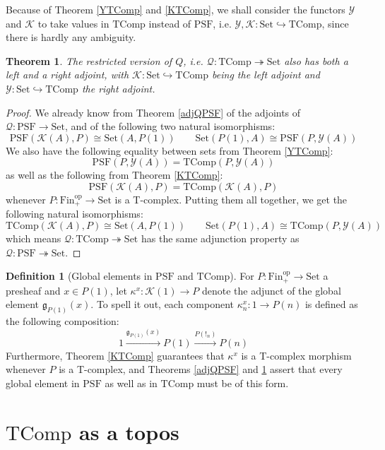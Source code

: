 \documentclass{article}
\newtheorem{theorem}{Theorem}[subsection]
\theoremstyle{remark}
\theoremstyle{definition}
\newtheorem{definition}{Definition}[subsection]
\newcommand{\Fin}{\mathrm{Fin}}
\newcommand{\Set}{\mathrm{Set}}
\newcommand{\PSF}{\mathrm{PSF}}
\newcommand{\op}{\mathrm{op}}
\newcommand{\Y}{\mathcal Y}
\newcommand{\K}{\mathcal K}
\newcommand{\g}{\mathfrak g}
\newcommand{\TComp}{\mathrm{TComp}}
\newcommand{\Q}{\mathcal Q}
\begin{document}
	Because of Theorem \ref{YTComp} and \ref{KTComp}, we shall consider the functors $\Y$ and $\K$ to take values in $\TComp$ instead of $\PSF$, i.e. $\Y,\K:\Set\hookrightarrow\TComp$, since there is hardly any ambiguity.
	\begin{theorem}\label{adjQT}
		The restricted version of $Q$, i.e. $\Q:\TComp\twoheadrightarrow\Set$ also has both a left and a right adjoint, with $\K:\Set\hookrightarrow\TComp$ being the left adjoint and $\Y:\Set\hookrightarrow\TComp$ the right adjoint.
	\end{theorem}
	\begin{proof}
		We already know from Theorem \ref{adjQPSF} of the adjoints of $\Q:\PSF\to\Set$, and of the following two natural isomorphisms:
		\[\PSF(\K(A),P)\cong\Set(A,P(1))\qquad\Set(P(1),A)\cong\PSF(P,\Y(A))\]
		We also have the following equality between sets from Theorem \ref{YTComp}:
		\[\PSF(P,\Y(A))=\TComp(P,\Y(A))\]
		as well as the following from Theorem \ref{KTComp}:
		\[\PSF(\K(A),P)=\TComp(\K(A),P)\]
		whenever $P:\Fin_+^\op\to\Set$ is a T-complex. Putting them all together, we get the following natural isomorphisms:
		\[\TComp(\K(A),P)\cong\Set(A,P(1))\qquad\Set(P(1),A)\cong\TComp(P,\Y(A))\]
		which means $\Q:\TComp\twoheadrightarrow\Set$ has the same adjunction property as $\Q:\PSF\twoheadrightarrow\Set$.
	\end{proof}
	\begin{definition}[Global elements in $\PSF$ and $\TComp$]
		For $P:\Fin_+^\op\to\Set$ a presheaf and $x\in P(1)$, let $\kappa^x:\K(1)\to P$ denote the adjunct of the global element $\g_{P(1)}(x)$. To spell it out, each component $\kappa^x_n:1\to P(n)$ is defined as the following composition:
		\[1\xrightarrow{\g_{P(1)}(x)}P(1)\xrightarrow{P(!_n)}P(n)\]
		Furthermore, Theorem \ref{KTComp} guarantees that $\kappa^x$ is a T-complex morphism whenever $P$ is a T-complex, and Theorems \ref{adjQPSF} and \ref{adjQT} assert that every global element in $\PSF$ as well as in $\TComp$ must be of this form.
	\end{definition}
	\section{$\TComp$ as a topos}
\end{document}
